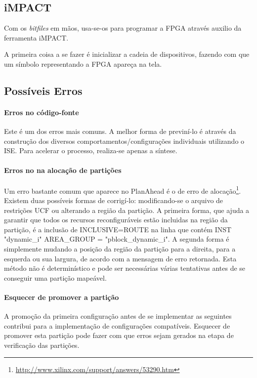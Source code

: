 \documentclass[11pt,a4paper,oneside]{book}
\begin{document}
\subsection{iMPACT}
Com os \textit{bitfiles} em mãos, usa-se-os para programar a FPGA através auxilio da ferramenta iMPACT. 

A primeira coisa a se fazer é inicializar a cadeia de dispositivos, fazendo com que um símbolo representando a FPGA apareça na tela.

\subsection{Possíveis Erros}
\paragraph{Erros no código-fonte} Este é um dos erros mais comuns.
A melhor forma de previní-lo é através da construção dos diversos comportamentos/configurações individuais utilizando o ISE.
Para acelerar o processo, realiza-se apenas a síntese.

\paragraph{Erros no na alocação de partições}
Um erro bastante comum que aparece no PlanAhead é o de erro de alocação\footnote{\url{http://www.xilinx.com/support/answers/53290.htm}}.
Existem duas possíveis formas de corrigí-lo: modificando-se o arquivo de restrições UCF ou alterando a região da partição.
A primeira forma, que ajuda a garantir que todos os recursos reconfiguráveis estão incluidas na região da partição, é a inclusão de \dlq{}INCLUSIVE=ROUTE\drq{} na linha que contém \dlq{}INST "dynamic\_i" AREA\_GROUP = "pblock\_dynamic\_i"\drq{}.
A segunda forma é simplemente mudando a posição da região da partição para a direita, para a esquerda ou sua largura, de acordo com a mensagem de erro retornada.
Esta método não é determinístico e pode ser necessárias várias tentativas antes de se conseguir uma partição mapeável. 

\paragraph{Esquecer de promover a partição}
A promoção da primeira configuração antes de se implementar as seguintes contribui para a implementação de configurações compatíveis.
Esquecer de promover esta partição pode fazer com que erros sejam gerados na etapa de verificação das partições.
\end{document}
